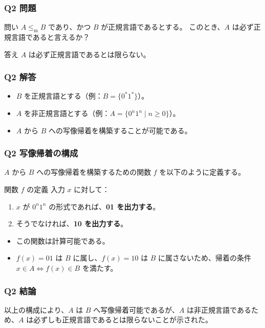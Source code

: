 \begin{frame}[fragile]\frametitle{Q2 問題}
  \begin{alertblock}{問い}
    $A \le_{\mathrm{m}} B$ であり、かつ $B$ が正規言語であるとする。
    このとき、$A$ は必ず正規言語であると言えるか？
  \end{alertblock}
  \begin{block}{答え}
    $A$ は必ず正規言語であるとは限らない。
  \end{block}
\end{frame}


\begin{frame}[fragile]\frametitle{Q2 解答}
  \begin{itemize}
    \item $B$ を正規言語とする（例：$B = \{0^*1^*\}$）。
    \item $A$ を非正規言語とする（例：$A = \{0^n1^n \mid n \ge 0\}$）。
    \item $A$ から $B$ への写像帰着を構築することが可能である。
  \end{itemize}
\end{frame}

\begin{frame}[fragile]\frametitle{Q2 写像帰着の構成}
    $A$ から $B$ への写像帰着を構築するための関数 $f$ を以下のように定義する。

    \begin{exampleblock}{関数 $f$ の定義}
        入力 $x$ に対して：
        \begin{enumerate}
            \item $x$ が $0^n1^n$ の形式であれば、\textbf{01 を出力する}。
            \item そうでなければ、\textbf{10 を出力する}。
        \end{enumerate}
    \end{exampleblock}

    \vfill
    \begin{itemize}
        \item この関数は計算可能である。
        \item $f(x) = 01$ は $B$ に属し、$f(x) = 10$ は $B$ に属さないため、帰着の条件 $x \in A \iff f(x) \in B$ を満たす。
    \end{itemize}
\end{frame}

\begin{frame}[fragile]\frametitle{Q2 結論}
    以上の構成により、$A$ は $B$ へ写像帰着可能であるが、$A$ は非正規言語であるため、$A$ は必ずしも正規言語であるとは限らないことが示された。
\end{frame}
